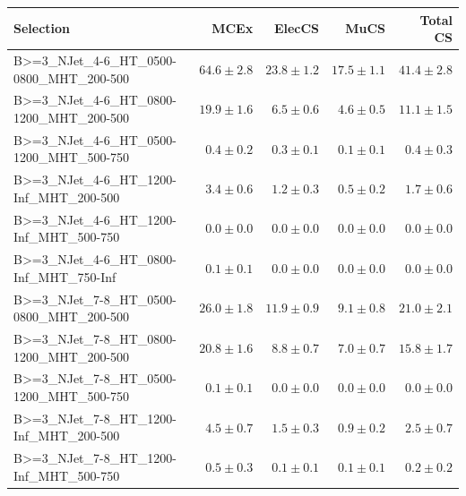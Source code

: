 \documentclass{beamer}
\begin{document}
\begin{frame}
\tiny
\begin{tabular}{lrrrr}
\toprule

                                                Selection  &          MCEx  &         ElecCS  &                     MuCS  &          Total CS  \\
\midrule
     B>=3\_NJet\_4-6\_HT\_0500-0800\_MHT\_200-500 &              $64.6\pm2.8$&             $23.8\pm1.2$&             $17.5\pm1.1$&                  $41.4\pm2.8$ \\
     B>=3\_NJet\_4-6\_HT\_0800-1200\_MHT\_200-500 &              $19.9\pm1.6$&              $6.5\pm0.6$&              $4.6\pm0.5$&                  $11.1\pm1.5$ \\
     B>=3\_NJet\_4-6\_HT\_0500-1200\_MHT\_500-750 &               $0.4\pm0.2$&              $0.3\pm0.1$&              $0.1\pm0.1$&                   $0.4\pm0.3$ \\
      B>=3\_NJet\_4-6\_HT\_1200-Inf\_MHT\_200-500 &               $3.4\pm0.6$&              $1.2\pm0.3$&              $0.5\pm0.2$&                   $1.7\pm0.6$ \\
      B>=3\_NJet\_4-6\_HT\_1200-Inf\_MHT\_500-750 &               $0.0\pm0.0$&              $0.0\pm0.0$&              $0.0\pm0.0$&                   $0.0\pm0.0$ \\
      B>=3\_NJet\_4-6\_HT\_0800-Inf\_MHT\_750-Inf &               $0.1\pm0.1$&              $0.0\pm0.0$&              $0.0\pm0.0$&                   $0.0\pm0.0$ \\
     B>=3\_NJet\_7-8\_HT\_0500-0800\_MHT\_200-500 &              $26.0\pm1.8$&             $11.9\pm0.9$&              $9.1\pm0.8$&                  $21.0\pm2.1$ \\
     B>=3\_NJet\_7-8\_HT\_0800-1200\_MHT\_200-500 &              $20.8\pm1.6$&              $8.8\pm0.7$&              $7.0\pm0.7$&                  $15.8\pm1.7$ \\
     B>=3\_NJet\_7-8\_HT\_0500-1200\_MHT\_500-750 &               $0.1\pm0.1$&              $0.0\pm0.0$&              $0.0\pm0.0$&                   $0.0\pm0.0$ \\
      B>=3\_NJet\_7-8\_HT\_1200-Inf\_MHT\_200-500 &               $4.5\pm0.7$&              $1.5\pm0.3$&              $0.9\pm0.2$&                   $2.5\pm0.7$ \\
      B>=3\_NJet\_7-8\_HT\_1200-Inf\_MHT\_500-750 &               $0.5\pm0.3$&              $0.1\pm0.1$&              $0.1\pm0.1$&                   $0.2\pm0.2$ \\

\end{tabular}
\end{frame}
\end{document}
